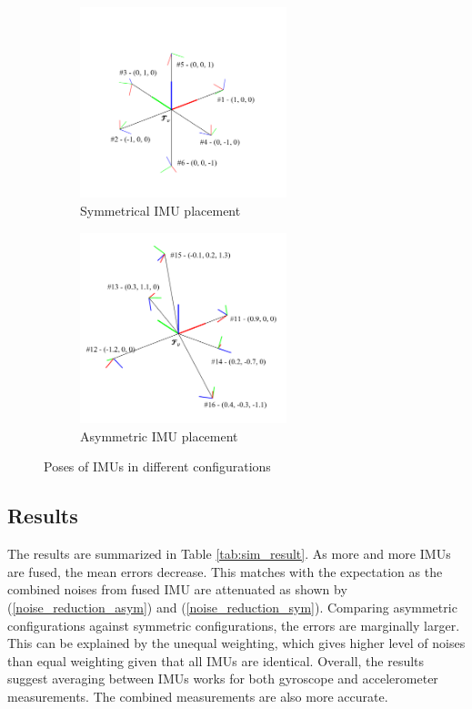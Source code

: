 \documentclass[conference]{IEEEtran}
\begin{document}
\begin{figure}[ht]
    \centering
    \begin{subfigure}[b]{0.45\linewidth}
        \centering
        \includegraphics[width=6cm]{figures/fig_sym_cropped.png}
        \caption{Symmetrical IMU placement}
        \label{fig:sym_imu}
    \end{subfigure}
    \begin{subfigure}[b]{0.45\linewidth}
        \centering
        \includegraphics[width=6cm]{figures/fig_asym_cropped.png}
        \caption{Asymmetric IMU placement}
        \label{fig:_asym_imu}
    \end{subfigure}
\caption{Poses of IMUs in different configurations }
\label{fig:imu_configurations}
\end{figure}

\subsection{Results}

The results are summarized in Table \ref{tab:sim_result}. As more and more IMUs are fused, the mean errors decrease. This matches with the expectation as the combined noises from fused IMU are attenuated as shown by (\ref{noise_reduction_asym}) and (\ref{noise_reduction_sym}). Comparing asymmetric configurations against symmetric configurations, the errors are marginally larger. This can be explained by the unequal weighting, which gives higher level of noises than equal weighting given that all IMUs are identical. Overall, the results suggest averaging between IMUs works for both gyroscope and accelerometer measurements. The combined measurements are also more accurate.
\end{document}
